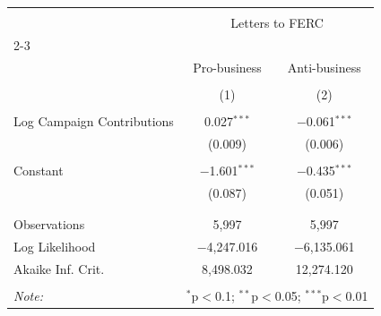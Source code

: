 
\begin{tabular}{@{\extracolsep{5pt}}lcc} 
\\[-1.8ex]\hline 
\hline \\[-1.8ex] 
 & \multicolumn{2}{c}{Letters to FERC} \\ 
\cline{2-3} 
\\[-1.8ex] & Pro-business & Anti-business \\ 
\\[-1.8ex] & (1) & (2)\\ 
\hline \\[-1.8ex] 
 Log Campaign Contributions & 0.027$^{***}$ & $-$0.061$^{***}$ \\ 
  & (0.009) & (0.006) \\ 
  & & \\ 
 Constant & $-$1.601$^{***}$ & $-$0.435$^{***}$ \\ 
  & (0.087) & (0.051) \\ 
  & & \\ 
\hline \\[-1.8ex] 
Observations & 5,997 & 5,997 \\ 
Log Likelihood & $-$4,247.016 & $-$6,135.061 \\ 
Akaike Inf. Crit. & 8,498.032 & 12,274.120 \\ 
\hline 
\hline \\[-1.8ex] 
\textit{Note:}  & \multicolumn{2}{r}{$^{*}$p$<$0.1; $^{**}$p$<$0.05; $^{***}$p$<$0.01} \\ 
\end{tabular} 
